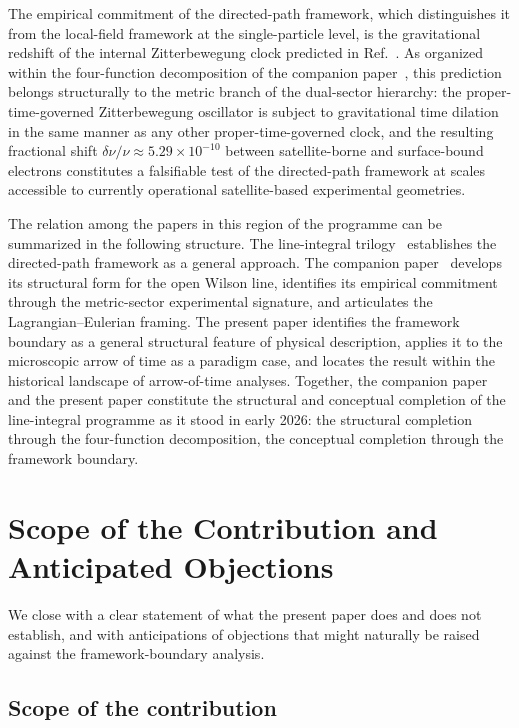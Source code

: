 \documentclass[%
 reprint, amsmath,amssymb, aps, prb, ]{revtex4-2}
\numberwithin{equation}{section}
\begin{document}
The empirical commitment of the directed-path framework, which distinguishes it from the local-field framework at the single-particle level, is the gravitational redshift of the internal Zitterbewegung clock predicted in Ref.~\cite{hanamura22}. As organized within the four-function decomposition of the companion paper~\cite{hanamura55}, this prediction belongs structurally to the metric branch of the dual-sector hierarchy: the proper-time-governed Zitterbewegung oscillator is subject to gravitational time dilation in the same manner as any other proper-time-governed clock, and the resulting fractional shift $\delta\nu/\nu \approx 5.29 \times 10^{-10}$ between satellite-borne and surface-bound electrons constitutes a falsifiable test of the directed-path framework at scales accessible to currently operational satellite-based experimental geometries.

The relation among the papers in this region of the programme can be summarized in the following structure. The line-integral trilogy~\cite{hanamura29, hanamura30, hanamura31} establishes the directed-path framework as a general approach. The companion paper~\cite{hanamura55} develops its structural form for the open Wilson line, identifies its empirical commitment through the metric-sector experimental signature, and articulates the Lagrangian--Eulerian framing. The present paper identifies the framework boundary as a general structural feature of physical description, applies it to the microscopic arrow of time as a paradigm case, and locates the result within the historical landscape of arrow-of-time analyses. Together, the companion paper and the present paper constitute the structural and conceptual completion of the line-integral programme as it stood in early 2026: the structural completion through the four-function decomposition, the conceptual completion through the framework boundary.


\section{Scope of the Contribution and Anticipated Objections}
\label{sec:scope}

We close with a clear statement of what the present paper does and does not establish, and with anticipations of objections that might naturally be raised against the framework-boundary analysis.

\subsection{Scope of the contribution}
\label{sec:scope_contribution}
\end{document}
